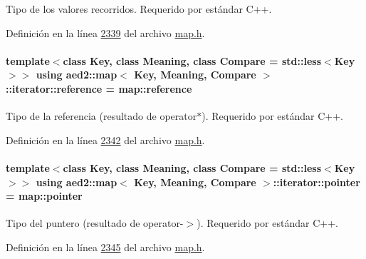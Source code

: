 Tipo de los valores recorridos. Requerido por estándar C++. 



Definición en la línea \hyperlink{map_8h_source_l02339}{2339} del archivo \hyperlink{map_8h_source}{map.\+h}.

\paragraph[{\texorpdfstring{reference}{reference}}]{\setlength{\rightskip}{0pt plus 5cm}template$<$class Key, class Meaning, class Compare = std\+::less$<$\+Key$>$$>$ using {\bf aed2\+::map}$<$ Key, Meaning, Compare $>$\+::{\bf iterator\+::reference} =  {\bf map\+::reference}}\hypertarget{classaed2_1_1map_1_1iterator_ac19788914a3110897e44c53f1318f6af_ac19788914a3110897e44c53f1318f6af}{}\label{classaed2_1_1map_1_1iterator_ac19788914a3110897e44c53f1318f6af_ac19788914a3110897e44c53f1318f6af}


Tipo de la referencia (resultado de operator$\ast$). Requerido por estándar C++. 



Definición en la línea \hyperlink{map_8h_source_l02342}{2342} del archivo \hyperlink{map_8h_source}{map.\+h}.

\paragraph[{\texorpdfstring{pointer}{pointer}}]{\setlength{\rightskip}{0pt plus 5cm}template$<$class Key, class Meaning, class Compare = std\+::less$<$\+Key$>$$>$ using {\bf aed2\+::map}$<$ Key, Meaning, Compare $>$\+::{\bf iterator\+::pointer} =  {\bf map\+::pointer}}\hypertarget{classaed2_1_1map_1_1iterator_a52ea7bdbf1dc6b252aec76633564bdf5_a52ea7bdbf1dc6b252aec76633564bdf5}{}\label{classaed2_1_1map_1_1iterator_a52ea7bdbf1dc6b252aec76633564bdf5_a52ea7bdbf1dc6b252aec76633564bdf5}


Tipo del puntero (resultado de operator-\/$>$). Requerido por estándar C++. 



Definición en la línea \hyperlink{map_8h_source_l02345}{2345} del archivo \hyperlink{map_8h_source}{map.\+h}.

